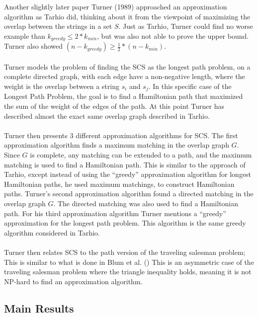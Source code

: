 \documentclass[letterpaper,11pt,titlepage]{article}
\begin{document}
Another slightly later paper Turner (1989) \cite{turner1989approximation} approached an approximation algorithm as Tarhio did, thinking about it from the viewpoint of maximizing the overlap between the strings in a set $S$.  Just as Tarhio, Turner could find no worse example than $k_{greedy} \leq 2* k_{min}$, but was also not able to prove the upper bound.  Turner also showed $(n - k_{greedy}) \geq \frac{1}{2}*(n - k_{min})$.  \\ \\ 

Turner models the problem of finding the SCS as the longest path problem, on a complete directed graph, with each edge have a non-negative length, where the weight is the overlap between a string $s_i$ and $s_j$.  In this specific case of the Longest Path Problem, the goal is to find a Hamiltonian path that maximized the sum of the weight of the edges of the path.  At this point Turner has described almost the exact same overlap graph described in Tarhio.  \\ \\
Turner then presents 3 different approximation algorithms for SCS. The first approximation algorithm finds a maximum matching in the overlap graph $G$.  Since $G$ is complete, any matching can be extended to a path, and the maximum matching is used to find a Hamiltonian path.  This is similar to the approach of Tarhio, except instead of using the ``greedy'' approximation algorithm for longest Hamiltonian paths, he used maximum matchings, to construct Hamiltonian paths.  Turner's second approximation algorithm found a directed matching in the overlap graph $G$. The directed matching was also used to find a Hamiltonian path.  For his third approximation algorithm Turner mentions a ``greedy'' approximation for the longest path problem.  This algorithm is the same greedy algorithm considered in Tarhio.  \\ \\

Turner then relates SCS to the path version of the traveling salesman problem; This is similar to what is done in Blum et al. ()  This is an asymmetric case of the traveling salesman problem where the triangle inequality holds, meaning it is not NP-hard to find an approximation algorithm.  

\subsection{Main Results}
\end{document}
